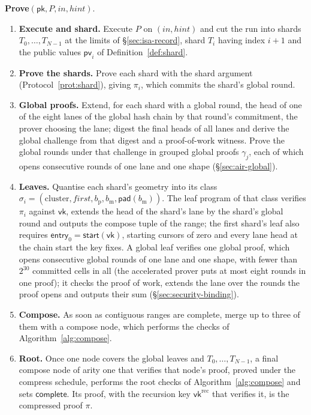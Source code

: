 \begin{protocol}
\smallskip
\noindent\textbf{Prove}$(\mathsf{pk}, P, \mathit{in}, \mathit{hint})$.
\begin{enumerate}
  \item \textbf{Execute and shard.} Execute $P$ on $(\mathit{in}, \mathit{hint})$ and cut the run into shards $T_0, \dots, T_{N-1}$ at the limits of \S\ref{sec:isa-record}, shard $T_i$ having index $i+1$ and the public values $\mathsf{pv}_i$ of Definition~\ref{def:shard}.
  \item \textbf{Prove the shards.} Prove each shard with the shard argument (Protocol~\ref{prot:shard}), giving $\pi_i$, which commits the shard's global round.
  \item \textbf{Global proofs.} Extend, for each shard with a global round, the head of one of the eight lanes of the global hash chain by that round's commitment, the prover choosing the lane; digest the final heads of all lanes and derive the global challenge from that digest and a proof-of-work witness. Prove the global rounds under that challenge in grouped global proofs $\gamma_j$, each of which opens consecutive rounds of one lane and one shape (\S\ref{sec:air-global}).
  \item \textbf{Leaves.} Quantise each shard's geometry into its class $\sigma_i = (\text{cluster}, \mathit{first}, b_{\mathrm p}, b_{\mathrm m}, \mathsf{pad}(b_{\mathrm m}))$. The leaf program of that class verifies $\pi_i$ against $\mathsf{vk}$, extends the head of the shard's lane by the shard's global round and outputs the compose tuple of the range; the first shard's leaf also requires $\mathsf{entry}_0 = \mathsf{start}(\mathsf{vk})$, starting cursors of zero and every lane head at the chain start the key fixes. A global leaf verifies one global proof, which opens consecutive global rounds of one lane and one shape, with fewer than $2^{30}$ committed cells in all (the accelerated prover puts at most eight rounds in one proof); it checks the proof of work, extends the lane over the rounds the proof opens and outputs their sum (\S\ref{sec:security-binding}).
  \item \textbf{Compose.} As soon as contiguous ranges are complete, merge up to three of them with a compose node, which performs the checks of Algorithm~\ref{alg:compose}.
  \item \textbf{Root.} Once one node covers the global leaves and $T_0, \dots, T_{N-1}$, a final compose node of arity one that verifies that node's proof, proved under the compress schedule, performs the root checks of Algorithm~\ref{alg:compose} and sets $\mathsf{complete}$. Its proof, with the recursion key $\mathsf{vk}^{\mathrm{rec}}$ that verifies it, is the compressed proof $\pi$.
\end{enumerate}


\end{protocol}
